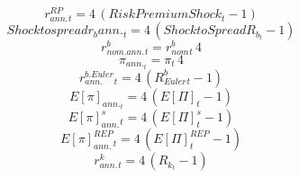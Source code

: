 \begin{dmath}
{ r^{RP}_{ann.}_{t}}=4\, \left({ Risk Premium Shock _{t}}-1\right)
\end{dmath}
\begin{dmath}
{Shock to spread r_b ann._{t}}=4\, \left({Shock to Spread R_b_{t}}-1\right)
\end{dmath}
\begin{dmath}
{ r^b_{nom.ann.}_{t}}={ r^b_{nom}_{t}}\, 4
\end{dmath}
\begin{dmath}
{ \pi_{ann.} _{t}}={ \pi _{t}}\, 4
\end{dmath}
\begin{dmath}
{ r^{b.Euler}_{ann.} _{t}}=4\, \left({ R^b_{Euler} _{t}}-1\right)
\end{dmath}
\begin{dmath}
{ E[\pi]_{ann.} _{t}}=4\, \left({ E[\Pi] _{t}}-1\right)
\end{dmath}
\begin{dmath}
{ E[\pi]_{ann.}^{s} _{t}}=4\, \left({ E[\Pi]^{s} _{t}}-1\right)
\end{dmath}
\begin{dmath}
{ E[\pi]_{ann.}^{REP} _{t}}=4\, \left({ E[\Pi]^{REP} _{t}}-1\right)
\end{dmath}
\begin{dmath}
{ r^k_{ann.} _{t}}=4\, \left({ R_k _{t}}-1\right)
\end{dmath}
